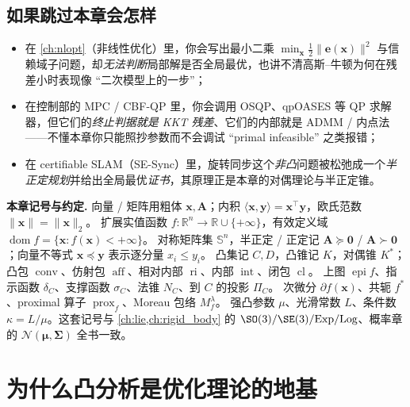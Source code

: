 \subsection*{如果跳过本章会怎样}
\begin{itemize}
  \item 在 \cref{ch:nlopt}（非线性优化）里，你会写出最小二乘 $\min_{\mathbf x}\tfrac12\|\mathbf e(\mathbf x)\|^2$ 与信赖域子问题，却\emph{无法判断}局部解是否全局最优，也讲不清高斯--牛顿为何在残差小时表现像 “二次模型上的一步”；
  \item 在控制部的 MPC / CBF-QP 里，你会调用 OSQP、qpOASES 等 QP 求解器，但它们的\emph{终止判据就是 KKT 残差}、它们的内部就是 ADMM / 内点法——不懂本章你只能照抄参数而不会调试 “primal infeasible” 之类报错；
  \item 在 certifiable SLAM（SE-Sync）里，旋转同步这个\emph{非凸}问题被松弛成一个\emph{半正定规划}并给出全局最优\emph{证书}，其原理正是本章的对偶理论与半正定锥。
\end{itemize}

\begin{note}
\textbf{本章记号与约定.}\;
向量 / 矩阵用粗体 $\mathbf x,\mathbf A$；内积 $\langle\mathbf x,\mathbf y\rangle=\mathbf x^\top\mathbf y$，欧氏范数 $\|\mathbf x\|=\|\mathbf x\|_2$。
扩展实值函数 $f:\mathbb{R}^n\to\mathbb{R}\cup\{+\infty\}$，有效定义域 $\operatorname{dom}f=\{\mathbf x:f(\mathbf x)<+\infty\}$。
对称矩阵集 $\mathbb{S}^n$，半正定 / 正定记 $\mathbf A\succeq\mathbf 0$ / $\mathbf A\succ\mathbf 0$；向量不等式 $\mathbf x\preceq\mathbf y$ 表示逐分量 $x_i\le y_i$。
凸集记 $C,D$，凸锥记 $K$，对偶锥 $K^\ast$；凸包 $\operatorname{conv}$、仿射包 $\operatorname{aff}$、相对内部 $\operatorname{ri}$、内部 $\operatorname{int}$、闭包 $\operatorname{cl}$。
上图 $\operatorname{epi}f$、指示函数 $\delta_C$、支撑函数 $\sigma_C$、法锥 $N_C$、到 $C$ 的投影 $\Pi_C$。
次微分 $\partial f(\mathbf x)$、共轭 $f^\ast$、proximal 算子 $\operatorname{prox}_f$、Moreau 包络 $M_f^\lambda$。
强凸参数 $\mu$、光滑常数 $L$、条件数 $\kappa=L/\mu$。这套记号与 \cref{ch:lie,ch:rigid_body} 的 $\SO(3)/\SE(3)/\mathrm{Exp}/\mathrm{Log}$、概率章的 $\mathcal N(\boldsymbol\mu,\boldsymbol\Sigma)$ 全书一致。
\end{note}

\section{为什么凸分析是优化理论的地基}
\label{sec:cvx-why}

